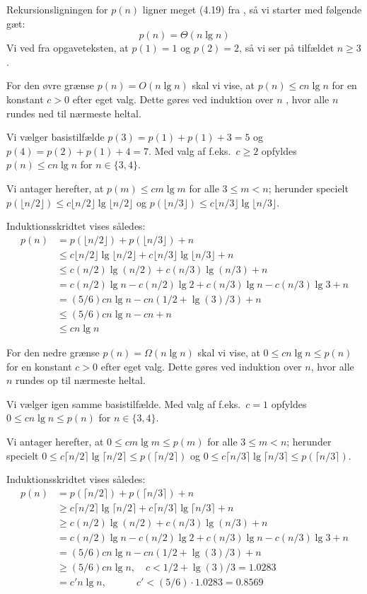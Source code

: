\documentclass[paper=a4, fleqn]{article}
\newcommand{\clrs}{\textsmaller{CLRS}\xspace}
\begin{document}
Rekursionsligningen for $p(n)$ ligner meget (4.19) fra \clrs, så vi starter
med følgende gæt:
\[
p(n)=\Theta(n\lg n)
\]
Vi ved fra opgaveteksten, at $p(1)=1$ og $p(2)=2$, så vi ser på tilfældet $n\geq
3$.

For den øvre grænse $p(n)=O(n\lg n)$ skal vi vise, at $p(n)\leq cn\lg n$ for en
konstant $c>0$ efter eget valg. Dette gøres ved induktion over $n$ , hvor alle
$n$ rundes ned til nærmeste heltal.

Vi vælger basistilfælde $p(3)=p(1)+p(1)+3 = 5$ og $p(4)=p(2)+p(1)+4=7$. Med valg
af f.eks.\ $c\geq 2$ opfyldes $p(n)\leq cn\lg n$ for $n\in\{3,4\}$.

Vi antager herefter, at $p(m)\leq cm\lg m$ for alle $3\leq m<n$; herunder
specielt $p(\lfloor n/2\rfloor)\leq c\lfloor n/2\rfloor\lg \lfloor n/2\rfloor$
og $p(\lfloor n/3\rfloor)\leq c\lfloor n/3\rfloor\lg \lfloor n/3\rfloor$.

Induktionsskridtet vises således:
\begin{align*}
p(n) &= p(\lfloor n/2\rfloor)+p(\lfloor n/3\rfloor)+n \\
     &\leq c\lfloor n/2\rfloor\lg \lfloor n/2\rfloor + c\lfloor n/3\rfloor\lg
     \lfloor n/3\rfloor + n \\
     &\leq c(n/2)\lg(n/2) + c(n/3)\lg(n/3) + n \\
     &= c(n/2)\lg n - c(n/2)\lg 2 + c(n/3)\lg n - c(n/3)\lg 3 + n \\
     &= (5/6)cn\lg n - cn(1/2 + \lg(3)/3) + n \\
     &\leq (5/6)cn\lg n - cn + n \\
     &\leq cn\lg n
\end{align*}

For den nedre grænse $p(n)=\Omega(n\lg n)$ skal vi vise, at $0\leq cn\lg n\leq p(n)$
for en konstant $c>0$ efter eget valg. Dette gøres ved induktion over $n$, hvor
alle $n$ rundes op til nærmeste heltal.

Vi vælger igen samme basistilfælde. Med valg af f.eks.\ $c=1$ opfyldes
$0\leq cn\lg n\leq p(n)$ for $n\in\{3,4\}$.

Vi antager herefter, at $0\leq cm\lg m\leq p(m)$ for alle $3\leq m<n$; herunder
specielt $0\leq c\lceil n/2\rceil\lg \lceil n/2\rceil\leq p(\lceil
n/2\rceil)$ og $0\leq c\lceil n/3\rceil\lg \lceil n/3\rceil\leq p(\lceil
n/3\rceil)$.

Induktionsskridtet vises således:
\begin{align*}
p(n) &= p(\lceil n/2\rceil)+p(\lceil n/3\rceil)+n \\
     &\geq c\lceil n/2\rceil\lg \lceil n/2\rceil + c\lceil n/3\rceil\lg
     \lceil n/3\rceil + n \\
     &\geq c(n/2)\lg(n/2) + c(n/3)\lg(n/3) + n \\
     &= c(n/2)\lg n - c(n/2)\lg 2 + c(n/3)\lg n - c(n/3)\lg 3 + n \\
     &= (5/6)cn\lg n - cn(1/2 + \lg(3)/3) + n \\
     &\geq (5/6)cn\lg n,\quad c < 1/2 + \lg(3)/3 = 1.0283 \\
     &= c'n\lg n,\quad\qquad c' < (5/6)\cdot 1.0283 = 0.8569 \\
\end{align*}
\end{document}
